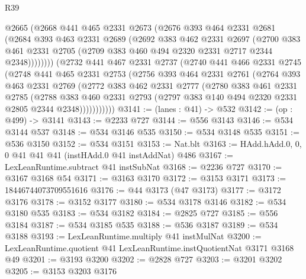 \begin{lexlean}{R39}
\begin{coremodule}
            @2665
            (@2668
              @441
              @465
              @2331
              @2673
              (@2676
                @393
                @464
                @2331
                @2681
                (@2684
                  @393
                  @463
                  @2331
                  @2689
                  (@2692
                    @383
                    @462
                    @2331
                    @2697
                    (@2700
                      @383
                      @461
                      @2331
                      @2705
                      (@2709 @383 @460 @494 @2320 @2331 @2717 @2344 @2348))))))))
        (@2732
          @441
          @467
          @2331
          @2737
          (@2740
            @441
            @466
            @2331
            @2745
            (@2748
              @441
              @465
              @2331
              @2753
              (@2756
                @393
                @464
                @2331
                @2761
                (@2764
                  @393
                  @463
                  @2331
                  @2769
                  (@2772
                    @383
                    @462
                    @2331
                    @2777
                    (@2780
                      @383
                      @461
                      @2331
                      @2785
                      (@2788
                        @383
                        @460
                        @2331
                        @2793
                        (@2797 @383 @140 @494 @2320 @2331 @2805 @2344 @2348)))))))))))
@3141 := (lanes : @41) -> @532
@3142 := (op : @499) -> @3141
@3143 := @2233 @727
@3144 := @556 @3143
@3146 := @534 @3144 @537
@3148 := @534 @3146 @535
@3150 := @534 @3148 @535
@3151 := @536 @3150
@3152 := @534 @3151
@3153 := Nat.blt
@3163 := HAdd.hAdd.{0, 0, 0} @41 @41 @41 (instHAdd.{0} @41 instAddNat) @486
@3167 := LexLeanRuntime.subtract @41 instSubNat
@3168 := @2236 @727
@3170 := @3167 @3168 @54
@3171 := @3163 @3170
@3172 := @3153 @3171
@3173 := 18446744073709551616
@3176 := @44 @3173 (@47 @3173)
@3177 := @3172 @3176
@3178 := @3152 @3177
@3180 := @534 @3178 @3146
@3182 := @534 @3180 @535
@3183 := @534 @3182
@3184 := @2825 @727
@3185 := @556 @3184
@3187 := @534 @3185 @535
@3188 := @536 @3187
@3189 := @534 @3188
@3193 := LexLeanRuntime.multiply @41 instMulNat
@3200 := LexLeanRuntime.quotient @41 LexLeanRuntime.instQuotientNat @3171 @3168 @49
@3201 := @3193 @3200
@3202 := @2828 @727
@3203 := @3201 @3202
@3205 := @3153 @3203 @3176

\end{coremodule}
\end{lexlean}
